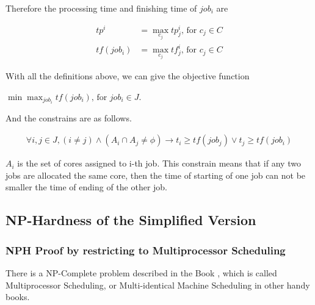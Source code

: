 \documentclass{article}
\begin{document}
        Therefore the processing time and finishing time of $job_i$ are
        
        \begin{center}
        $$
        \begin{aligned}
        tp^i &= \max_{c_j} tp^i_j\text{, for }c_j \in C\\
        tf(job_i) &= \max_{c_j} tf^i_j\text{, for }c_j \in C
        \end{aligned}
        $$
        \end{center}
        
        With all the definitions above, we can give the objective function
        
        \begin{center}
            $\min \max_{job_i} tf(job_i)\text{, for } job_i \in J$.
        \end{center}
        
        And the constrains are as follows.
        \vspace{-5mm}
        \begin{center}
        $$
        \begin{aligned}
            \forall i, j \in J,
            (i \neq j) \wedge\left(A_{i} \cap A_{j} \neq \phi\right)
            \rightarrow 
            t_{i} \geqslant t f\left(job_{j}\right) \vee t_{j} \geqslant t f\left(job_{i}\right)
        \end{aligned}
        $$
        \end{center}
        
        $A_i$ is the set of cores assigned to i-th job. This constrain means that if any two jobs are allocated the same core, then the time of starting of one job can not be smaller the time of ending of the other job.
        
\subsection{NP-Hardness of the Simplified Version}
\label{NPH1}
\subsubsection{NPH Proof by restricting to Multiprocessor Scheduling}

There is a NP-Complete problem described in the Book \cite{garey1979computers}, which is called Multiprocessor Scheduling, or Multi-identical Machine Scheduling in other handy books. 
\end{document}
